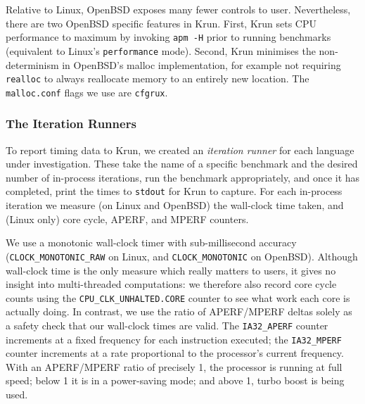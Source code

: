 \documentclass[acmlarge]{acmart}\settopmatter{printfolios=true}
\newcommand{\krun}{Krun\xspace}
\begin{document}
Relative to Linux, OpenBSD exposes many fewer controls to user. Nevertheless,
there are two OpenBSD specific features in \krun.
First, \krun sets CPU performance to maximum by invoking \texttt{apm -H} prior
to running benchmarks (equivalent to Linux's \texttt{performance} mode).
Second, \krun minimises the non-determinism in OpenBSD's malloc implementation,
for example not requiring \texttt{realloc} to always reallocate memory to
an entirely new location. The \texttt{malloc.conf} flags we use are \texttt{cfgrux}.


\subsubsection{The Iteration Runners}

To report timing data to \krun, we created an
\emph{iteration runner} for each language under investigation.
These take the name of a specific benchmark and
the desired number of in-process iterations, run the benchmark appropriately,
and once it has completed, print the times to \texttt{stdout} for \krun to
capture. For each in-process iteration we
measure (on Linux and OpenBSD) the wall-clock time taken, and (Linux only) core
cycle, APERF, and MPERF counters.

We use a monotonic wall-clock timer with sub-millisec\-ond accuracy
(\texttt{CLOCK\_MONOTONIC\_RAW} on Linux, and \texttt{CLOCK\-\_MONOTONIC} on
OpenBSD). Although wall-clock time is the only measure which really matters to
users, it gives no insight into multi-threaded computations: we therefore also record
core cycle counts using the \texttt{CPU\-\_CLK\-\_UNHALTED\-.CORE} counter to see
what work each core is actually doing. In contrast, we use the ratio of APERF/MPERF deltas
solely as a safety check that our wall-clock times are valid.
The \texttt{IA32\_APERF} counter increments at a fixed
frequency for each instruction executed; the \texttt{IA32\_MPERF} counter increments at a rate
proportional to the processor's current frequency. With an APERF/MPERF ratio of
precisely 1, the processor is running at full speed; below 1 it is in
a power-saving mode; and above 1, turbo boost is being used.
\end{document}
